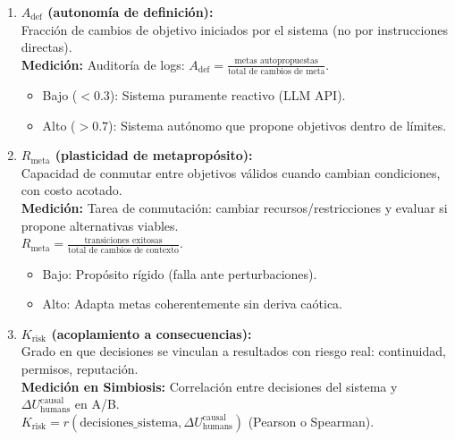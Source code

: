 \begin{enumerate}
\def\labelenumi{\arabic{enumi}.}
\tightlist
\item
  \textbf{\(A_{\text{def}}\) (autonomía de definición):}\\
  Fracción de cambios de objetivo iniciados por el sistema (no por
  instrucciones directas).\\
  \textbf{Medición:} Auditoría de logs:
  \(A_{\text{def}} = \frac{\text{metas autopropuestas}}{\text{total de cambios de meta}}\).

  \begin{itemize}
  \tightlist
  \item
    Bajo (\(<0.3\)): Sistema puramente reactivo (LLM API).
  \item
    Alto (\(>0.7\)): Sistema autónomo que propone objetivos dentro de
    límites.
  \end{itemize}
\item
  \textbf{\(R_{\text{meta}}\) (plasticidad de metapropósito):}\\
  Capacidad de conmutar entre objetivos válidos cuando cambian
  condiciones, con costo acotado.\\
  \textbf{Medición:} Tarea de conmutación: cambiar
  recursos/restricciones y evaluar si propone alternativas viables.\\
  \(R_{\text{meta}} = \frac{\text{transiciones exitosas}}{\text{total de cambios de contexto}}\).

  \begin{itemize}
  \tightlist
  \item
    Bajo: Propósito rígido (falla ante perturbaciones).
  \item
    Alto: Adapta metas coherentemente sin deriva caótica.
  \end{itemize}
\item
  \textbf{\(K_{\text{risk}}\) (acoplamiento a consecuencias):}\\
  Grado en que decisiones se vinculan a resultados con riesgo real:
  continuidad, permisos, reputación.\\
  \textbf{Medición en Simbiosis:} Correlación entre decisiones del
  sistema y \(\Delta U_{\text{humans}}^{\text{causal}}\) en A/B.\\
  \(K_{\text{risk}} = r(\text{decisiones\_sistema}, \Delta U_{\text{humans}}^{\text{causal}})\)
  (Pearson o Spearman).


\end{enumerate}
